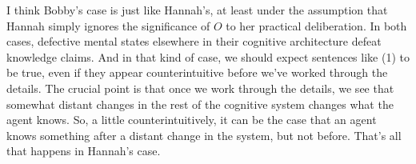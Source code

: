 I think Bobby's case is just like Hannah's, at least under the assumption that Hannah simply ignores the significance of \(O\) to her practical deliberation. In both cases, defective mental states elsewhere in their cognitive architecture defeat knowledge claims. And in that kind of case, we should expect sentences like (1) to be true, even if they appear counterintuitive before we've worked through the details. The crucial point is that once we work through the details, we see that somewhat distant changes in the rest of the cognitive system changes what the agent knows. So, a little counterintuitively, it can be the case that an agent knows something after a distant change in the system, but not before. That's all that happens in Hannah's case.